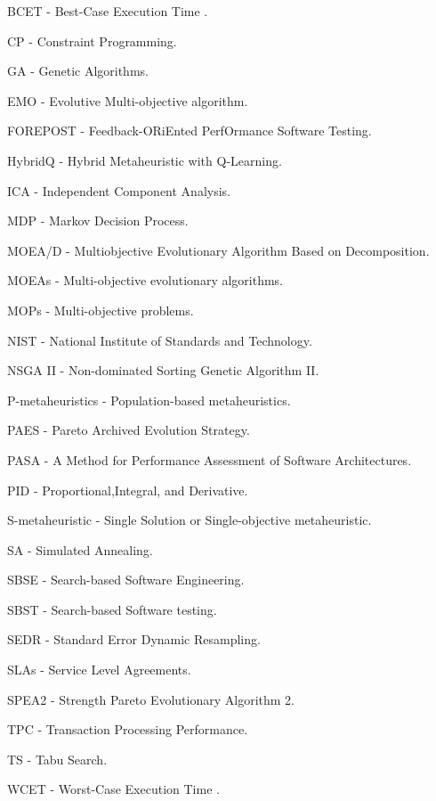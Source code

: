 
\begin{description}
 \item BCET - Best-Case Execution Time .
 \item CP - Constraint Programming.
 \item GA - Genetic Algorithms.
 \item EMO - Evolutive Multi-objective algorithm.
 \item FOREPOST - Feedback-ORiEnted PerfOrmance Software Testing.
 \item HybridQ - Hybrid Metaheuristic with Q-Learning.
 \item ICA - Independent Component Analysis.
 \item MDP - Markov Decision Process.
 \item MOEA/D - Multiobjective Evolutionary Algorithm Based on Decomposition.
 \item MOEAs - Multi-objective evolutionary algorithms. 
 \item MOPs - Multi-objective problems. 
 \item NIST -  National Institute of Standards and Technology. 
 \item NSGA II - Non-dominated Sorting Genetic Algorithm II.
 \item P-metaheuristics - Population-based metaheuristics.
 \item PAES - Pareto Archived Evolution Strategy.
 \item PASA - A Method for Performance Assessment of Software Architectures.
 \item PID - Proportional,Integral, and Derivative.
 \item S-metaheuristic - Single Solution or Single-objective metaheuristic.
 \item SA - Simulated Annealing.
 \item SBSE - Search-based Software Engineering.
 \item SBST - Search-based Software testing. 
 \item SEDR - Standard Error Dynamic Resampling.
 \item SLAs - Service Level Agreements.
 \item SPEA2 - Strength Pareto Evolutionary Algorithm 2.
 \item TPC - Transaction Processing Performance.
 \item TS - Tabu Search.
 \item WCET - Worst-Case Execution Time .

 
\end{description}
